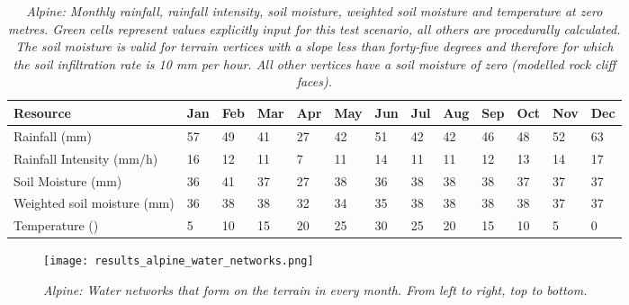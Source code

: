 \begin{table}[htb!]
  \centering
	    \begin{tabular}{|p{3cm}|p{.7cm}|p{.7cm}|p{.7cm}|p{.7cm}|p{.7cm}|p{.7cm}|p{.7cm}|p{.7cm}|p{.7cm}|p{.7cm}|p{.7cm}|p{.7cm}|}
		\hline	
  	    \textbf{Resource} & \textbf{Jan} & \textbf{Feb} & \textbf{Mar} & \textbf{Apr} & \textbf{May} & \textbf{Jun} & \textbf{Jul} & \textbf{Aug} & \textbf{Sep} & \textbf{Oct} & \textbf{Nov} & \textbf{Dec} \\
  	    \hline	
		Rainfall (mm) & \cellcolor{green}57 & \cellcolor{green}49 & \cellcolor{green}41 & \cellcolor{green}27 & \cellcolor{green}42 & \cellcolor{green}51 & \cellcolor{green}42 & \cellcolor{green}42 & \cellcolor{green}46 & \cellcolor{green}48 & \cellcolor{green}52 & \cellcolor{green}63  \\
		\hline
		Rainfall Intensity (mm/h) & \cellcolor{green}16 & \cellcolor{green}12 & \cellcolor{green}11 & \cellcolor{green}7 & \cellcolor{green}11 & \cellcolor{green}14 & \cellcolor{green}11 & \cellcolor{green}11 & \cellcolor{green}12 & \cellcolor{green}13 & \cellcolor{green}14 & \cellcolor{green}17  \\
		\hline
		Soil Moisture (mm) & 36 & 41 & 37 & 27 & 38 & 36 & 38 & 38 & 38 & 37 & 37 & 37  \\
		\hline
		Weighted soil moisture (mm)	& 36 & 38	& 38 & 32 & 34 & 35 & 38 & 38 & 38 & 38 & 37 & 37 \\
		\hline
		Temperature (\textdegree) & 5 & 10 & 15 & 20 & 25 & \cellcolor{green}30 & 25 & 20 & 15 & 10 & 5 & \cellcolor{green}0  \\
		\hline
		\end{tabular}
		\caption{\textit{Alpine: Monthly rainfall, rainfall intensity, soil moisture, weighted soil moisture and temperature at zero metres. Green cells represent values explicitly input for this test scenario, all others are procedurally calculated. The soil moisture is valid for terrain vertices with a slope less than forty-five degrees and therefore for which the soil infiltration rate is 10 mm per hour. All other vertices have a soil moisture of zero (modelled rock cliff faces).}}
	  \label{tab:results_alpine_input_resources}
\end{table}

\begin{figure}[htb!]
\center
	\texttt{[image: results\_alpine\_water\_networks.png]}
	\caption{\textit{Alpine: Water networks that form on the terrain in every month. From left to right, top to bottom.}}
	\label{fig:results_alpine_water_networks}
\end{figure}

